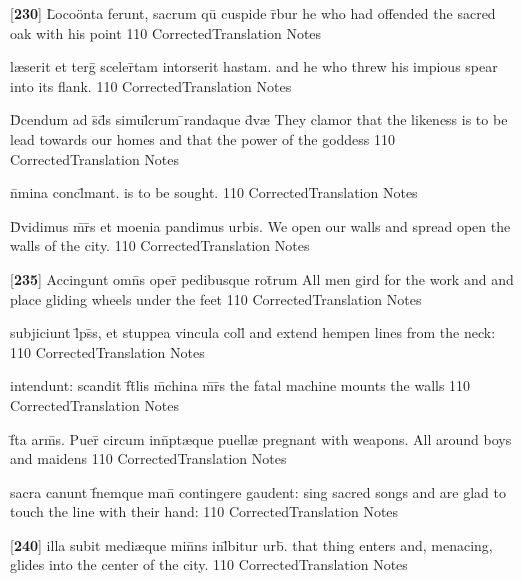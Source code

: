 \latline
  {[\textbf{230}] L\={}oco\"{o}nta ferunt, sacrum qu\={\macron {\i}} cuspide r\={}bur }
  { he who had offended the sacred oak with his point }
  {110}
  { CorrectedTranslation }
  { Notes }


\latline
  {l{\ae}serit et terg\={} sceler\={}tam intorserit hastam.}
  { and he who threw his impious spear into its flank. }
  {110}
  { CorrectedTranslation }
  { Notes }


\latline
  {D\={}cendum ad s\={}d\={}s simul\={}crum \={}randaque d\={\macron {\i}}v{\ae}}
  { They clamor that the likeness is to be lead towards our homes and that the power of the goddess  }
  {110}
  { CorrectedTranslation }
  { Notes }


\latline
  {n\={}mina concl\={}mant.}
  { is to be sought. }
  {110}
  { CorrectedTranslation }
  { Notes }


\latline
  {D\={\macron {\i}}vidimus m\={}r\={}s et moenia pandimus urbis.}
  { We open our walls and spread open the walls of the city. }
  {110}
  { CorrectedTranslation }
  { Notes }


\latline
  {[\textbf{235}] Accingunt omn\={}s oper\={\macron {\i}} pedibusque rot\={}rum}
  { All men gird for the work and and place gliding wheels under the feet  }
  {110}
  { CorrectedTranslation }
  { Notes }


\latline
  {subjiciunt l\={}ps\={}s, et stuppea vincula coll\={}}
  { and extend hempen lines from the neck: }
  {110}
  { CorrectedTranslation }
  { Notes }


\latline
  {intendunt: scandit f\={}t\={}lis m\={}china m\={}r\={}s}
  { the fatal machine mounts the walls  }
  {110}
  { CorrectedTranslation }
  { Notes }


\latline
  {f\={}ta arm\={\macron {\i}}s.  Puer\={\macron {\i}} circum inn\={}pt{\ae}que puell{\ae}}
  { pregnant with weapons.  All around boys and maidens }
  {110}
  { CorrectedTranslation }
  { Notes }


\latline
  {sacra canunt f\={}nemque man\={} contingere gaudent:}
  { sing sacred songs and are glad to touch the line with their hand: }
  {110}
  { CorrectedTranslation }
  { Notes }


\latline
  {[\textbf{240}] illa subit medi{\ae}que min\={}ns inl\={}bitur urb\={\macron {\i}}.}
  { that thing enters and, menacing, glides into the center of the city. }
  {110}
  { CorrectedTranslation }
  { Notes }


